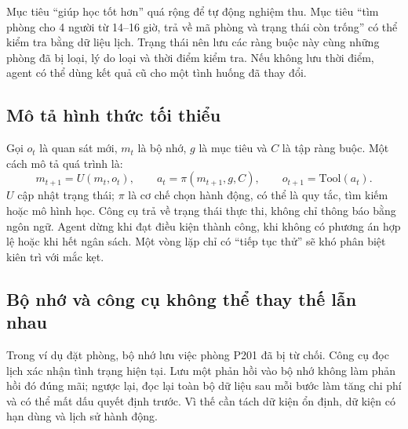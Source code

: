 \documentclass[12pt,a4paper]{article}
\begin{document}
Mục tiêu ``giúp học tốt hơn'' quá rộng để tự động nghiệm thu. Mục tiêu ``tìm phòng cho
4 người từ 14--16 giờ, trả về mã phòng và trạng thái còn trống'' có thể kiểm tra bằng dữ
liệu lịch. Trạng thái nên lưu các ràng buộc này cùng những phòng đã bị loại, lý do loại
và thời điểm kiểm tra. Nếu không lưu thời điểm, agent có thể dùng kết quả cũ cho một
tình huống đã thay đổi.

\begin{center}
\end{center}

\subsection{Mô tả hình thức tối thiểu}
Gọi $o_t$ là quan sát mới, $m_t$ là bộ nhớ, $g$ là mục tiêu và $C$ là tập ràng buộc.
Một cách mô tả quá trình là:
\[
m_{t+1}=U(m_t,o_t),\qquad a_t=\pi(m_{t+1},g,C),\qquad
o_{t+1}=\mathrm{Tool}(a_t).
\]
$U$ cập nhật trạng thái; $\pi$ là cơ chế chọn hành động, có thể là quy tắc, tìm kiếm
hoặc mô hình học. Công cụ trả về trạng thái thực thi, không chỉ thông báo bằng ngôn ngữ.
Agent dừng khi đạt điều kiện thành công, khi không có phương án hợp lệ hoặc khi hết
ngân sách. Một vòng lặp chỉ có ``tiếp tục thử'' sẽ khó phân biệt kiên trì với mắc kẹt.

\subsection{Bộ nhớ và công cụ không thể thay thế lẫn nhau}
Trong ví dụ đặt phòng, bộ nhớ lưu việc phòng P201 đã bị từ chối. Công cụ đọc lịch xác
nhận tình trạng hiện tại. Lưu một phản hồi vào bộ nhớ không làm phản hồi đó đúng mãi;
ngược lại, đọc lại toàn bộ dữ liệu sau mỗi bước làm tăng chi phí và có thể mất dấu quyết
định trước. Vì thế cần tách dữ kiện ổn định, dữ kiện có hạn dùng và lịch sử hành động.
\end{document}
